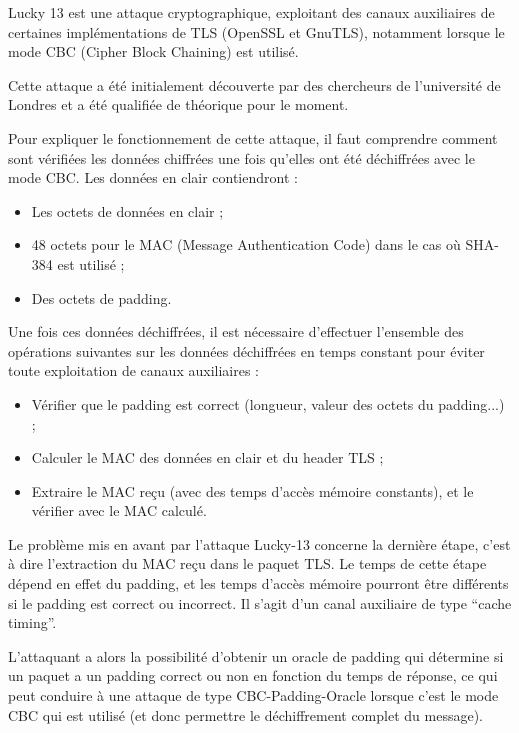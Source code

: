 \vspace{1em}

Lucky 13 est une attaque cryptographique, exploitant des canaux auxiliaires de certaines implémentations de TLS (OpenSSL et GnuTLS), notamment lorsque le mode CBC (Cipher Block Chaining) est utilisé.

Cette attaque a été initialement découverte par des chercheurs de l'université de Londres et a été qualifiée de théorique pour le moment.

Pour expliquer le fonctionnement de cette attaque, il faut comprendre comment sont vérifiées les données chiffrées une fois qu'elles ont été déchiffrées avec le mode CBC. Les données en clair contiendront :

\begin{itemize}
\item{Les octets de données en clair ;}
\item{48 octets pour le MAC (Message Authentication Code) dans le cas où SHA-384 est utilisé ;}
\item{Des octets de padding.}
\end{itemize}

Une fois ces données déchiffrées, il est nécessaire d'effectuer l'ensemble des opérations suivantes sur les données déchiffrées en temps constant pour éviter toute exploitation de canaux auxiliaires :

\begin{itemize}
\item{Vérifier que le padding est correct (longueur, valeur des octets du padding...) ;}
\item{Calculer le MAC des données en clair et du header TLS ;}
\item{Extraire le MAC reçu (avec des temps d'accès mémoire constants), et le vérifier avec le MAC calculé.}
\end{itemize}

Le problème mis en avant par l'attaque Lucky-13 concerne la dernière étape, c'est à dire l'extraction du MAC reçu dans le paquet TLS. Le temps de cette étape dépend en effet du padding, et les temps d'accès mémoire pourront être différents si le padding est correct ou incorrect. Il s'agit d'un canal auxiliaire de type ``cache timing''.

L'attaquant a alors la possibilité d'obtenir un oracle de padding qui détermine si un paquet a un padding correct ou non en fonction du temps de réponse, ce qui peut conduire à une attaque de type CBC-Padding-Oracle lorsque c'est le mode CBC qui est utilisé (et donc permettre le déchiffrement complet du message).

